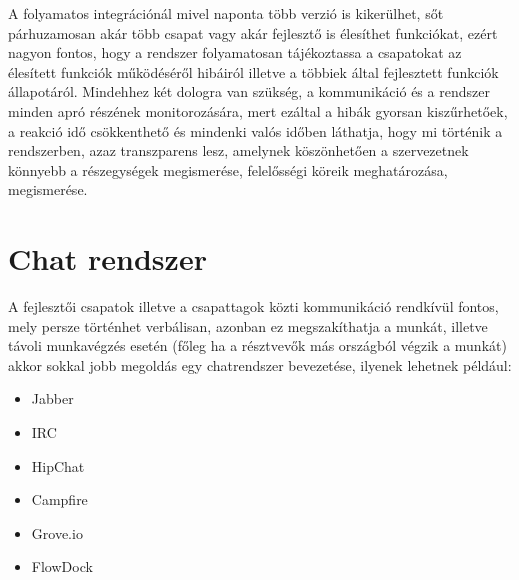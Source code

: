 A folyamatos integrációnál mivel naponta több verzió is kikerülhet, sőt párhuzamosan akár több csapat vagy akár fejlesztő is élesíthet funkciókat, ezért nagyon fontos, hogy a rendszer folyamatosan tájékoztassa a csapatokat az élesített funkciók működéséről hibáiról illetve a többiek által fejlesztett funkciók állapotáról. Mindehhez két dologra van szükség, a kommunikáció és a rendszer minden apró részének monitorozására, mert ezáltal a hibák gyorsan kiszűrhetőek, a reakció idő csökkenthető és mindenki valós időben láthatja, hogy mi történik a rendszerben, azaz transzparens lesz, amelynek köszönhetően a szervezetnek könnyebb a részegységek megismerése, felelősségi köreik meghatározása, megismerése.

\section{Chat rendszer}
A fejlesztői csapatok illetve a csapattagok közti kommunikáció rendkívül fontos, mely persze történhet verbálisan, azonban ez megszakíthatja a munkát, illetve távoli munkavégzés esetén (főleg ha a résztvevők más országból végzik a munkát) akkor sokkal jobb megoldás egy chatrendszer bevezetése, ilyenek lehetnek például:
\begin{itemize}
	\item Jabber
	\item IRC
	\item HipChat
	\item Campfire
	\item Grove.io
	\item FlowDock
\end{itemize}

